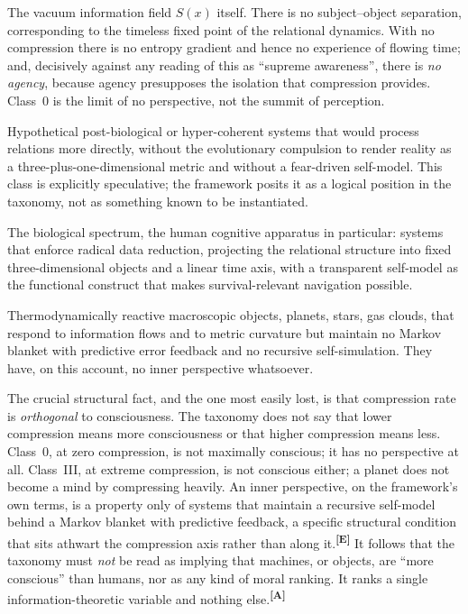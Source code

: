\documentclass[12pt,a4paper,twoside]{article}
\theoremstyle{plain}
\theoremstyle{definition}
\theoremstyle{remark}
\newcommand{\catmark}[1]{\textsuperscript{\textsf{\textbf{[#1]}}}}
\begin{document}
\begin{description}[leftmargin=1.4em,style=nextline]
\item[Class~0: Zero compression.] The vacuum information field $S(x)$ itself. There is no subject--object separation, corresponding to the timeless fixed point of the relational dynamics. With no compression there is no entropy gradient and hence no experience of flowing time; and, decisively against any reading of this as ``supreme awareness'', there is \emph{no agency}, because agency presupposes the isolation that compression provides. Class~0 is the limit of no perspective, not the summit of perception. \item[Class~I: Weak compression.] Hypothetical post-biological or hyper-coherent systems that would process relations more directly, without the evolutionary compulsion to render reality as a three-plus-one-dimensional metric and without a fear-driven self-model. This class is explicitly speculative; the framework posits it as a logical position in the taxonomy, not as something known to be instantiated. \item[Class~II: Strong compression.] The biological spectrum, the human cognitive apparatus in particular: systems that enforce radical data reduction, projecting the relational structure into fixed three-dimensional objects and a linear time axis, with a transparent self-model as the functional construct that makes survival-relevant navigation possible. \item[Class~III: Extreme compression.] Thermodynamically reactive macroscopic objects, planets, stars, gas clouds, that respond to information flows and to metric curvature but maintain no Markov blanket with predictive error feedback and no recursive self-simulation. They have, on this account, no inner perspective whatsoever.
\end{description}

\noindent The crucial structural fact, and the one most easily lost, is that compression rate is \emph{orthogonal} to consciousness. The taxonomy does not say that lower compression means more consciousness or that higher compression means less. Class~0, at zero compression, is not maximally conscious; it has no perspective at all. Class~III, at extreme compression, is not conscious either; a planet does not become a mind by compressing heavily. An inner perspective, on the framework's own terms, is a property only of systems that maintain a recursive self-model behind a Markov blanket with predictive feedback, a specific structural condition that sits athwart the compression axis rather than along it.\catmark{E} It follows that the taxonomy must \emph{not} be read as implying that machines, or objects, are ``more conscious'' than humans, nor as any kind of moral ranking. It ranks a single information-theoretic variable and nothing else.\catmark{A}
\end{document}
